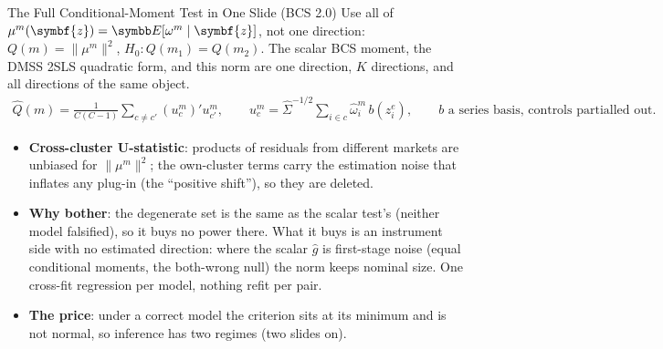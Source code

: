 \documentclass[aspectratio=169,10pt]{beamer}
\begin{document}
\begin{frame}{The Full Conditional-Moment Test in One Slide (BCS 2.0)}
\small
Use all of $\mu^m(\symbf{z}) = \E[\omega^m \mid \symbf{z}]$, not one direction: $Q(m) = \|\mu^m\|^2$, $H_0: Q(m_1) = Q(m_2)$. The scalar BCS moment, the DMSS 2SLS quadratic form, and this norm are one direction, $K$ directions, and all directions of the same object.
\begin{align*}
\widehat{Q}(m) = \frac{1}{C(C-1)} \sum_{c \neq c'} (u^m_c)' u^m_{c'}, \qquad u^m_c = \widehat{\Sigma}^{-1/2} \sum_{i \in c} \widehat{\omega}^m_{i}\, b(z^e_{i}), \qquad b \text{ a series basis, controls partialled out}.
\end{align*}
\begin{itemize}
\item \textbf{Cross-cluster U-statistic}: products of residuals from different markets are unbiased for $\|\mu^m\|^2$; the own-cluster terms carry the estimation noise that inflates any plug-in (the ``positive shift''), so they are deleted.
\item \textbf{Why bother}: the degenerate set is the \alert{same} as the scalar test's (neither model falsified), so it buys no power there. What it buys is an instrument side with \alert{no estimated direction}: where the scalar $\widehat{g}$ is first-stage noise (equal conditional moments, the both-wrong null) the norm keeps nominal size. One cross-fit regression per model, nothing refit per pair.
\item \textbf{The price}: under a correct model the criterion sits at its minimum and is not normal, so inference has two regimes (two slides on).
\end{itemize}
\end{frame}
\end{document}
